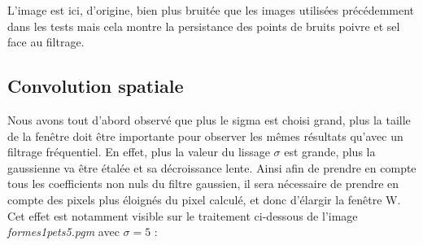 \documentclass[a4,12pt]{article}
\begin{document}
L'image est ici, d'origine, bien plus bruitée que les images utilisées précédemment dans les tests mais cela montre la persistance des points de bruits poivre et sel face au filtrage.

\subsection{Convolution spatiale}

Nous avons tout d'abord observé que plus le sigma est choisi grand, plus la taille de la fenêtre doit être importante pour observer les mêmes résultats qu'avec un filtrage fréquentiel. En effet, plus la valeur du lissage $\sigma$ est grande, plus la gaussienne va être étalée et sa décroissance lente. Ainsi afin de prendre en compte tous les coefficients non nuls du filtre gaussien, il sera nécessaire de prendre en compte des pixels plus éloignés du pixel calculé, et donc d'élargir la fenêtre W.\\

Cet effet est notamment visible sur le traitement ci-dessous de l'image \textit{formes1pets5.pgm} avec $\sigma = 5$ :\\
\end{document}
